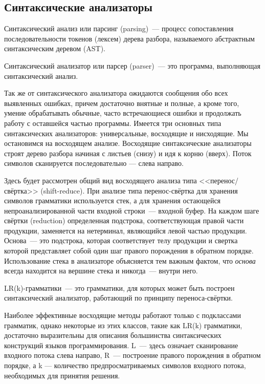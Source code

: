 \label{sec:relatedworks}

\subsection{Синтаксические анализаторы}
Синтаксический анализ или парсинг (parsing)~--- процесс сопоставления последовательности токенов (лексем) дерева разбора, называемого абстрактным синтаксическим деревом (AST).

Синтаксический анализатор или парсер (parser)~--- это программа, выполняющая синтаксический анализ.

Так же от синтаксического анализатора ожидаются сообщения обо всех выявленных ошибках, причем достаточно внятные и полные, а кроме того, умение обрабатывать обычные, часто встречающиеся ошибки и продолжать работу с оставшейся частью программы.
Имеется три основных типа синтаксических анализаторов: универсальные, восходящие и нисходящие\cite{DB}. Мы остановимся на восходящем анализе. Восходящие синтаксические анализаторы строят дерево разбора начиная с листьев (снизу) и идя к корню (вверх). Поток символов сканируется последовательно --- слева направо.

Здесь будет рассмотрен общий вид восходящего анализа типа <<перенос/свёртка>> (shift-reduce). При анализе типа перенос-свёртка для хранения символов грамматики используется стек, а для хранения остающейся непроанализированной части входной строки~--- входной буфер. На каждом шаге свёртки (reduction) определенная подстрока, соответствующая правой части продукции, заменяется на нетерминал, являющийся левой частью продукции. Основа~--- это подстрока, которая соответствует телу продукции и свертка которой представляет собой один шаг правого порождения в обратном порядке. Использование стека в анализаторе объясняется тем важным фактом, что {\it основа} всегда находится на вершине стека и никогда~--- внутри него.

LR(k)-грамматики~--- это грамматики, для которых может быть построен синтаксический анализатор, работающий по принципу переноса-свёртки.

Наиболее эффективные восходящие методы работают только с подклассами грамматик, однако некоторые из этих классов, такие как LR(k) грамматики, достаточно выразительны для описания большинства синтаксических конструкций языков программирования.
L~--- здесь означает сканирование входного потока слева направо, R~--- построение правого порождения в обратном порядке, а k --- количество предпросматриваемых символов входного потока, необходимых для принятия решения. 


